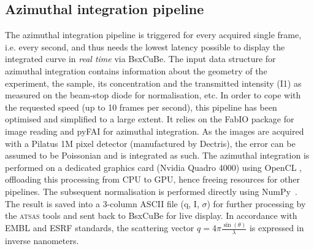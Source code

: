 \documentclass[preprint,pdf]{iucr}              %
\begin{document}
\subsection{Azimuthal integration pipeline}
\label{AI}
The azimuthal integration pipeline is triggered for every acquired single frame,
i.e. every second, and thus needs the lowest latency possible to
display the integrated curve in \textit{real time} via BsxCuBe.
The input data structure for azimuthal integration contains
information about the geometry of the experiment, the sample, its concentration
and the transmitted intensity (I1) as measured on the beam-stop diode for
normalisation, etc.
In order to cope with the requested speed (up to 10 frames per second), this
pipeline has been optimised and simplified to a large extent.
It relies on the FabIO \cite{fabio} package for image reading and pyFAI
\cite{pyFAI} for azimuthal integration.
As the images are acquired with a Pilatus 1M pixel detector (manufactured by
Dectris), the error can be assumed to be Poissonian and is integrated as such.
The azimuthal integration is performed on a dedicated graphics card
(Nvidia Quadro 4000) using OpenCL \cite{pyFAI_gpu}, offloading this processing
from CPU to GPU, hence freeing resources for other pipelines.
The subsequent normalisation is performed directly using NumPy~\cite{numpy}.
The result is saved into a 3-column ASCII file (q, I, $\sigma$) for further
processing by the \textsc{atsas} tools \cite{ATSAS2} and sent back to BsxCuBe
for live display.
In accordance with EMBL and ESRF standards, the scattering vector
$q=4\pi\frac{\sin(\theta)}{\lambda}$ is expressed in inverse nanometers.
\end{document}
